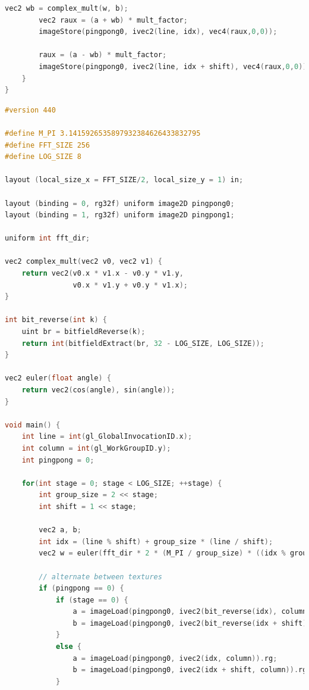 \documentclass[
  oneside,
  11pt, a4paper,
  footinclude=true,
  headinclude=true,
  cleardoublepage=empty
]{scrbook}
\begin{document}
\begin{lstlisting}[language=C,caption={FFT Radix-2 Cooley-Tukey Vertical stage pass, see \autoref{sec:ct-impl}},label={lst:glsl-radix2-ct-stage-vertical}]
        vec2 wb = complex_mult(w, b);
        vec2 raux = (a + wb) * mult_factor;
        imageStore(pingpong0, ivec2(line, idx), vec4(raux,0,0));
            
        raux = (a - wb) * mult_factor;
        imageStore(pingpong0, ivec2(line, idx + shift), vec4(raux,0,0));
    }
}
\end{lstlisting}

\begin{lstlisting}[language=C,caption={FFT Radix-2 Cooley-Tukey Horizontal unique pass, see \autoref{subsec:all-stages-in-one-pass}},label={lst:glsl-radix2-ct-unique-horizontal}]
#version 440

#define M_PI 3.1415926535897932384626433832795
#define FFT_SIZE 256
#define LOG_SIZE 8

layout (local_size_x = FFT_SIZE/2, local_size_y = 1) in;

layout (binding = 0, rg32f) uniform image2D pingpong0;
layout (binding = 1, rg32f) uniform image2D pingpong1;

uniform int fft_dir;

vec2 complex_mult(vec2 v0, vec2 v1) {
    return vec2(v0.x * v1.x - v0.y * v1.y,
                v0.x * v1.y + v0.y * v1.x);
}

int bit_reverse(int k) {
    uint br = bitfieldReverse(k);
    return int(bitfieldExtract(br, 32 - LOG_SIZE, LOG_SIZE));
}

vec2 euler(float angle) {
    return vec2(cos(angle), sin(angle));
}

void main() {
    int line = int(gl_GlobalInvocationID.x);
    int column = int(gl_WorkGroupID.y);
    int pingpong = 0;
    
    for(int stage = 0; stage < LOG_SIZE; ++stage) {
        int group_size = 2 << stage;
        int shift = 1 << stage;

        vec2 a, b;
        int idx = (line % shift) + group_size * (line / shift);
        vec2 w = euler(fft_dir * 2 * (M_PI / group_size) * ((idx % group_size) % shift));

        // alternate between textures
        if (pingpong == 0) {
            if (stage == 0) {
                a = imageLoad(pingpong0, ivec2(bit_reverse(idx), column)).rg;
                b = imageLoad(pingpong0, ivec2(bit_reverse(idx + shift), column)).rg;
            }
            else {
                a = imageLoad(pingpong0, ivec2(idx, column)).rg;
                b = imageLoad(pingpong0, ivec2(idx + shift, column)).rg;
            }


\end{lstlisting}
\end{document}
